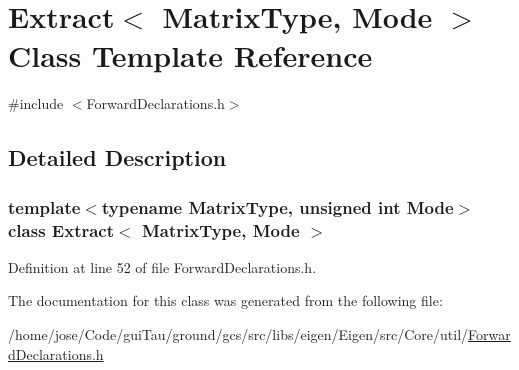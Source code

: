 \hypertarget{class_extract}{\section{Extract$<$ Matrix\-Type, Mode $>$ Class Template Reference}
\label{class_extract}
}


{\ttfamily \#include $<$Forward\-Declarations.\-h$>$}



\subsection{Detailed Description}
\subsubsection*{template$<$typename Matrix\-Type, unsigned int Mode$>$class Extract$<$ Matrix\-Type, Mode $>$}



Definition at line 52 of file Forward\-Declarations.\-h.



The documentation for this class was generated from the following file\-:\begin{DoxyCompactItemize}
\item 
/home/jose/\-Code/gui\-Tau/ground/gcs/src/libs/eigen/\-Eigen/src/\-Core/util/\hyperlink{_forward_declarations_8h}{Forward\-Declarations.\-h}\end{DoxyCompactItemize}
